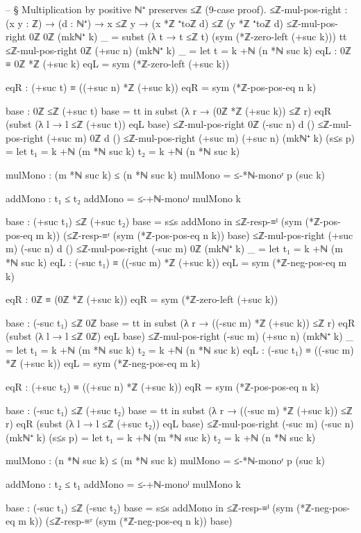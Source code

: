 \documentclass[11pt,a4paper]{book}
\begin{document}
\begin{code}
-- § Multiplication by positive ℕ⁺ preserves ≤ℤ (9-case proof).
≤ℤ-mul-pos-right : (x y : ℤ) → (d : ℕ⁺) → x ≤ℤ y → (x *ℤ ⁺toℤ d) ≤ℤ (y *ℤ ⁺toℤ d)
≤ℤ-mul-pos-right 0ℤ 0ℤ (mkℕ⁺ k) _ =
  subst
    (λ t → t ≤ℤ t)
    (sym (*ℤ-zero-left (+suc k)))
    tt
≤ℤ-mul-pos-right 0ℤ (+suc n) (mkℕ⁺ k) _ =
  let
    t = k +ℕ (n *ℕ suc k)
    eqL : 0ℤ ≡ 0ℤ *ℤ (+suc k)
    eqL = sym (*ℤ-zero-left (+suc k))

    eqR : (+suc t) ≡ ((+suc n) *ℤ (+suc k))
    eqR = sym (*ℤ-pos-pos-eq n k)

    base : 0ℤ ≤ℤ (+suc t)
    base = tt
  in
  subst (λ r → (0ℤ *ℤ (+suc k)) ≤ℤ r) eqR
    (subst (λ l → l ≤ℤ (+suc t)) eqL base)
≤ℤ-mul-pos-right 0ℤ (-suc n) d ()
≤ℤ-mul-pos-right (+suc m) 0ℤ d ()
≤ℤ-mul-pos-right (+suc m) (+suc n) (mkℕ⁺ k) (s≤s p) =
  let
    t₁ = k +ℕ (m *ℕ suc k)
    t₂ = k +ℕ (n *ℕ suc k)

    mulMono : (m *ℕ suc k) ≤ (n *ℕ suc k)
    mulMono = ≤-*ℕ-monoʳ p (suc k)

    addMono : t₁ ≤ t₂
    addMono = ≤-+ℕ-monoˡ mulMono k

    base : (+suc t₁) ≤ℤ (+suc t₂)
    base = s≤s addMono
  in
  ≤ℤ-resp-≡ˡ (sym (*ℤ-pos-pos-eq m k))
    (≤ℤ-resp-≡ʳ (sym (*ℤ-pos-pos-eq n k)) base)
≤ℤ-mul-pos-right (+suc m) (-suc n) d ()
≤ℤ-mul-pos-right (-suc m) 0ℤ (mkℕ⁺ k) _ =
  let
    t₁ = k +ℕ (m *ℕ suc k)
    eqL : (-suc t₁) ≡ ((-suc m) *ℤ (+suc k))
    eqL = sym (*ℤ-neg-pos-eq m k)

    eqR : 0ℤ ≡ (0ℤ *ℤ (+suc k))
    eqR = sym (*ℤ-zero-left (+suc k))

    base : (-suc t₁) ≤ℤ 0ℤ
    base = tt
  in
  subst (λ r → ((-suc m) *ℤ (+suc k)) ≤ℤ r) eqR
    (subst (λ l → l ≤ℤ 0ℤ) eqL base)
≤ℤ-mul-pos-right (-suc m) (+suc n) (mkℕ⁺ k) _ =
  let
    t₁ = k +ℕ (m *ℕ suc k)
    t₂ = k +ℕ (n *ℕ suc k)
    eqL : (-suc t₁) ≡ ((-suc m) *ℤ (+suc k))
    eqL = sym (*ℤ-neg-pos-eq m k)

    eqR : (+suc t₂) ≡ ((+suc n) *ℤ (+suc k))
    eqR = sym (*ℤ-pos-pos-eq n k)

    base : (-suc t₁) ≤ℤ (+suc t₂)
    base = tt
  in
  subst (λ r → ((-suc m) *ℤ (+suc k)) ≤ℤ r) eqR
    (subst (λ l → l ≤ℤ (+suc t₂)) eqL base)
≤ℤ-mul-pos-right (-suc m) (-suc n) (mkℕ⁺ k) (s≤s p) =
  let
    t₁ = k +ℕ (m *ℕ suc k)
    t₂ = k +ℕ (n *ℕ suc k)

    mulMono : (n *ℕ suc k) ≤ (m *ℕ suc k)
    mulMono = ≤-*ℕ-monoʳ p (suc k)

    addMono : t₂ ≤ t₁
    addMono = ≤-+ℕ-monoˡ mulMono k

    base : (-suc t₁) ≤ℤ (-suc t₂)
    base = s≤s addMono
  in
  ≤ℤ-resp-≡ˡ (sym (*ℤ-neg-pos-eq m k))
    (≤ℤ-resp-≡ʳ (sym (*ℤ-neg-pos-eq n k)) base)
\end{code}
\end{document}
